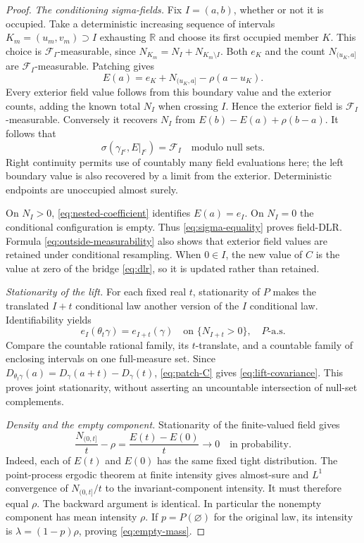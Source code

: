 \documentclass[11pt,reqno]{amsart}
\theoremstyle{definition}
\theoremstyle{remark}
\newcommand{\R}{\mathbb R}
\newcommand{\1}{\mathbf 1}
\newcommand{\cF}{\mathcal F}
\numberwithin{equation}{section}
\begin{document}
\begin{proof}
\emph{The conditioning sigma-fields.}
Fix $I=(a,b)$, whether or not it is occupied. Take a deterministic
increasing sequence of intervals $K_m=(u_m,v_m)\supset I$ exhausting
$\R$ and choose its first occupied member $K$. This choice is
$\cF_I$-measurable, since $N_{K_m}=N_I+N_{K_m\setminus I}$.
Both $e_K$ and the count $N_{(u_K,a]}$ are $\cF_I$-measurable.
Patching gives
\begin{equation}\label{eq:outside-measurability}
E(a)=e_K+N_{(u_K,a]}-\rho(a-u_K).
\end{equation}
Every exterior field value follows from this boundary value and the
exterior counts, adding the known total $N_I$ when crossing $I$.
Hence the exterior field is $\cF_I$-measurable. Conversely it recovers
$N_I$ from $E(b)-E(a)+\rho(b-a)$. It follows that
\begin{equation}\label{eq:sigma-equality}
\sigma(\gamma_{I^c},E|_{I^c})=\cF_I\quad\text{modulo null sets}.
\end{equation}
Right continuity permits use of countably many field evaluations here;
the left boundary value is also recovered by a limit from the exterior.
Deterministic endpoints are unoccupied almost surely.

On $N_I>0$, \eqref{eq:nested-coefficient} identifies $E(a)=e_I$.
On $N_I=0$ the conditional configuration is empty. Thus
\eqref{eq:sigma-equality} proves field-DLR. Formula
\eqref{eq:outside-measurability} also shows that exterior field values
are retained under conditional resampling. When $0\in I$, the new
value of $C$ is the value at zero of the bridge \eqref{eq:dlr}, so it
is updated rather than retained.

\emph{Stationarity of the lift.}
For each fixed real $t$, stationarity of $P$ makes the translated
$I+t$ conditional law another version of the $I$ conditional law.
Identifiability yields
\[
e_I(\theta_t\gamma)=e_{I+t}(\gamma)
\quad\text{on }\{N_{I+t}>0\},\quad P\text{-a.s.}
\]
Compare the countable rational family, its $t$-translate, and a
countable family of enclosing intervals on one full-measure set.
Since $D_{\theta_t\gamma}(a)=D_\gamma(a+t)-D_\gamma(t)$,
\eqref{eq:patch-C} gives \eqref{eq:lift-covariance}. This proves joint
stationarity, without asserting an uncountable intersection of null-set
complements.

\emph{Density and the empty component.}
Stationarity of the finite-valued field gives
\[
\frac{N_{(0,t]}}t-\rho=\frac{E(t)-E(0)}t\longrightarrow0
\quad\text{in probability}.
\]
Indeed, each of $E(t)$ and $E(0)$ has the same fixed tight distribution.
The point-process ergodic theorem at finite intensity gives almost-sure
and $L^1$ convergence of $N_{(0,t]}/t$ to the invariant-component
intensity. It must therefore equal $\rho$. The backward argument is
identical. In particular the nonempty component has mean intensity
$\rho$. If $p=P(\varnothing)$ for the original law, its intensity is
$\lambda=(1-p)\rho$, proving \eqref{eq:empty-mass}.
\end{proof}
\end{document}
